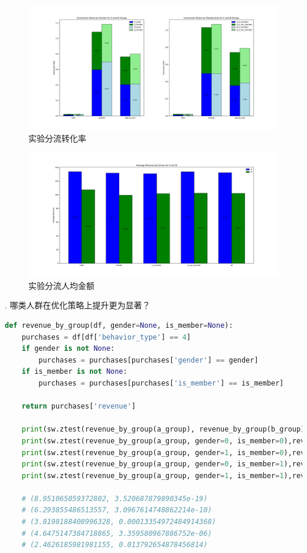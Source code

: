 \documentclass[a4paper]{article}
\begin{document}
\begin{figure}[H]
	\centering
	\includegraphics[width=1\textwidth]{./Conversion_rate.pdf}
	\caption{实验分流转化率}
	\label{fig:4}
\end{figure}

\begin{figure}[H]
	\centering
	\includegraphics[width=1\textwidth]{./Average_revenue.pdf}
	\caption{实验分流人均金额}
	\label{fig:5}
\end{figure}

.	哪类人群在优化策略上提升更为显著？

\begin{lstlisting}[language=Python]
    def revenue_by_group(df, gender=None, is_member=None):
    purchases = df[df['behavior_type'] == 4]
    if gender is not None:
        purchases = purchases[purchases['gender'] == gender]
    if is_member is not None:
        purchases = purchases[purchases['is_member'] == is_member]

    return purchases['revenue']

    print(sw.ztest(revenue_by_group(a_group), revenue_by_group(b_group), value=0))
    print(sw.ztest(revenue_by_group(a_group, gender=0, is_member=0),revenue_by_group(b_group, gender=0, is_member=0) , value=0))
    print(sw.ztest(revenue_by_group(a_group, gender=1, is_member=0),revenue_by_group(b_group, gender=1, is_member=0) , value=0))
    print(sw.ztest(revenue_by_group(a_group, gender=0, is_member=1),revenue_by_group(b_group, gender=0, is_member=1) , value=0))
    print(sw.ztest(revenue_by_group(a_group, gender=1, is_member=1),revenue_by_group(b_group, gender=1, is_member=1) , value=0))

    # (8.951065059372802, 3.520687879890345e-19)
    # (6.293855486513557, 3.0967614748862214e-10)
    # (3.8198188408996328, 0.00013354972484914368)
    # (4.6475147384718865, 3.359580967886752e-06)
    # (2.4626185981981155, 0.013792654878456814)
\end{lstlisting}
\end{document}
